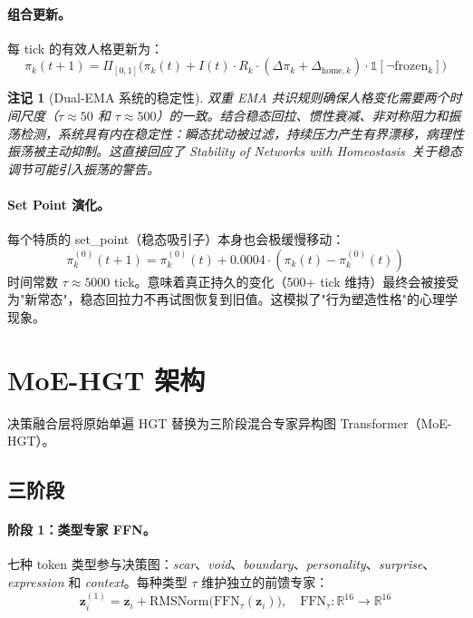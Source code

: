 \documentclass[11pt]{article}
\newtheorem{remark}[theorem]{注记}
\begin{document}
\paragraph{组合更新。}每 tick 的有效人格更新为：
\begin{equation}
\pi_k(t+1) = \Pi_{[0,1]}\bigl(\pi_k(t) + I(t) \cdot R_k \cdot (\Delta\pi_k + \Delta_{\text{home},k}) \cdot \mathbb{1}[\neg\text{frozen}_k]\bigr)
\end{equation}

\begin{remark}[Dual-EMA 系统的稳定性]
双重 EMA 共识规则确保人格变化需要两个时间尺度（$\tau \approx 50$ 和 $\tau \approx 500$）的一致。结合稳态回拉、惯性衰减、非对称阻力和振荡检测，系统具有内在稳定性：瞬态扰动被过滤，持续压力产生有界漂移，病理性振荡被主动抑制。这直接回应了 Stability of Networks with Homeostasis~\cite{stability2015}关于稳态调节可能引入振荡的警告。
\end{remark}

\paragraph{Set Point 演化。}每个特质的 set\_point（稳态吸引子）本身也会极缓慢移动：
\begin{equation}
\pi_k^{(0)}(t+1) = \pi_k^{(0)}(t) + 0.0004 \cdot (\pi_k(t) - \pi_k^{(0)}(t))
\end{equation}
时间常数 $\tau \approx 5000$ tick。意味着真正持久的变化（500+ tick 维持）最终会被接受为"新常态"，稳态回拉力不再试图恢复到旧值。这模拟了"行为塑造性格"的心理学现象。

\section{MoE-HGT 架构}
\label{sec:moe}

决策融合层将原始单遍 HGT 替换为三阶段混合专家异构图 Transformer（MoE-HGT）。

\subsection{三阶段}

\paragraph{阶段 1：类型专家 FFN。}
七种 token 类型参与决策图：\emph{scar}、\emph{void}、\emph{boundary}、\emph{personality}、\emph{surprise}、\emph{expression} 和 \emph{context}。每种类型 $\tau$ 维护独立的前馈专家：
\begin{equation}
\mathbf{z}_i^{(1)} = \mathbf{z}_i + \text{RMSNorm}\bigl(\text{FFN}_\tau(\mathbf{z}_i)\bigr), \quad \text{FFN}_\tau: \mathbb{R}^{16} \to \mathbb{R}^{16}
\end{equation}
\end{document}
